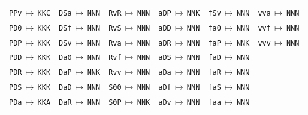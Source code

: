 {\begin{longtable}{@{}llllll@{}}
\texttt{PPv}\,$\mapsto$\,\texttt{KKC} & \texttt{DSa}\,$\mapsto$\,\texttt{NNN} & \texttt{RvR}\,$\mapsto$\,\texttt{NNN} & \texttt{aDP}\,$\mapsto$\,\texttt{NNK} & \texttt{fSv}\,$\mapsto$\,\texttt{NNN} & \texttt{vva}\,$\mapsto$\,\texttt{NNN} \\
\texttt{PD0}\,$\mapsto$\,\texttt{KKK} & \texttt{DSf}\,$\mapsto$\,\texttt{NNN} & \texttt{RvS}\,$\mapsto$\,\texttt{NNN} & \texttt{aDD}\,$\mapsto$\,\texttt{NNN} & \texttt{fa0}\,$\mapsto$\,\texttt{NNN} & \texttt{vvf}\,$\mapsto$\,\texttt{NNN} \\
\texttt{PDP}\,$\mapsto$\,\texttt{KKK} & \texttt{DSv}\,$\mapsto$\,\texttt{NNN} & \texttt{Rva}\,$\mapsto$\,\texttt{NNN} & \texttt{aDR}\,$\mapsto$\,\texttt{NNN} & \texttt{faP}\,$\mapsto$\,\texttt{NNK} & \texttt{vvv}\,$\mapsto$\,\texttt{NNN} \\
\texttt{PDD}\,$\mapsto$\,\texttt{KKK} & \texttt{Da0}\,$\mapsto$\,\texttt{NNN} & \texttt{Rvf}\,$\mapsto$\,\texttt{NNN} & \texttt{aDS}\,$\mapsto$\,\texttt{NNN} & \texttt{faD}\,$\mapsto$\,\texttt{NNN} &  \\
\texttt{PDR}\,$\mapsto$\,\texttt{KKK} & \texttt{DaP}\,$\mapsto$\,\texttt{NNK} & \texttt{Rvv}\,$\mapsto$\,\texttt{NNN} & \texttt{aDa}\,$\mapsto$\,\texttt{NNN} & \texttt{faR}\,$\mapsto$\,\texttt{NNN} &  \\
\texttt{PDS}\,$\mapsto$\,\texttt{KKK} & \texttt{DaD}\,$\mapsto$\,\texttt{NNN} & \texttt{S00}\,$\mapsto$\,\texttt{NNN} & \texttt{aDf}\,$\mapsto$\,\texttt{NNN} & \texttt{faS}\,$\mapsto$\,\texttt{NNN} &  \\
\texttt{PDa}\,$\mapsto$\,\texttt{KKA} & \texttt{DaR}\,$\mapsto$\,\texttt{NNN} & \texttt{S0P}\,$\mapsto$\,\texttt{NNK} & \texttt{aDv}\,$\mapsto$\,\texttt{NNN} & \texttt{faa}\,$\mapsto$\,\texttt{NNN} &  \\
\end{longtable}}
